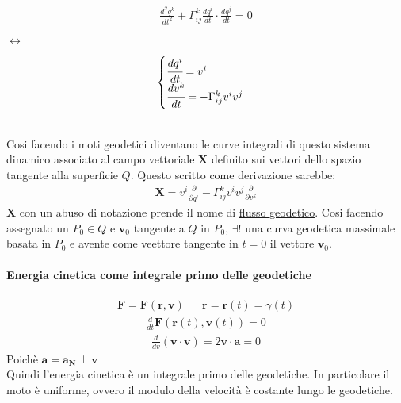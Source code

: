 \begin{minipage}{4cm}
    \begin{align*}
        \frac{d^2q^k}{dt^2}+\Gamma^k_{ij}\frac{dq^i}{dt}\cdot \frac{dq^j}{dt}=0
    \end{align*}
\end{minipage}$\longleftrightarrow$
\begin{minipage}{4cm}
    \begin{align*}
        \begin{cases}
            \cfrac{dq^i}{dt}=v^i\\
            \cfrac{dv^k}{dt}=-\Gamma^k_{ij}v^iv^j
        \end{cases}
    \end{align*}
\end{minipage}
\\
Cosi facendo i moti geodetici diventano le curve integrali di questo sistema dinamico associato al campo vettoriale $\mathbf{X}$ definito sui vettori dello spazio tangente alla superficie $Q$. Questo scritto come derivazione sarebbe:
\begin{align*}
    \mathbf{X}=v^i\frac{\partial}{\partial q^i}-\Gamma^k_{ij}v^iv^j\frac{\partial}{\partial v^k}
\end{align*}
$\mathbf{X}$ con un abuso di notazione prende il nome di \underline{flusso geodetico}.
Cosi facendo assegnato un $P_0\in Q$ e $\mathbf{v}_0$ tangente a $Q$ in $P_0$, $\exists!$ una curva geodetica massimale basata in $P_0$ e avente come veettore tangente in $t=0$ il vettore $\mathbf{v}_0$.
\paragraph*{Energia cinetica come integrale primo delle geodetiche}
\begin{align*}
    \mathbf{F}=\mathbf{F}(\mathbf{r},\mathbf{v}) && \mathbf{r}=\mathbf{r}(t)=\gamma(t)
\end{align*}
\begin{align*}
    \frac{d}{dt}\mathbf{F}(\mathbf{r}(t),\mathbf{v}(t))=0
\end{align*}
\begin{align*}
    \frac{d}{dv}(\mathbf{v}\cdot \mathbf{v})=2\mathbf{v}\cdot\mathbf{a}=0
\end{align*}
Poichè $\mathbf{a}=\mathbf{a}_{\mathbf{N}}\perp \mathbf{v}$\\
Quindi l'energia cinetica è un integrale primo delle geodetiche. In particolare il moto è uniforme, ovvero il modulo della velocità è costante lungo le geodetiche.

